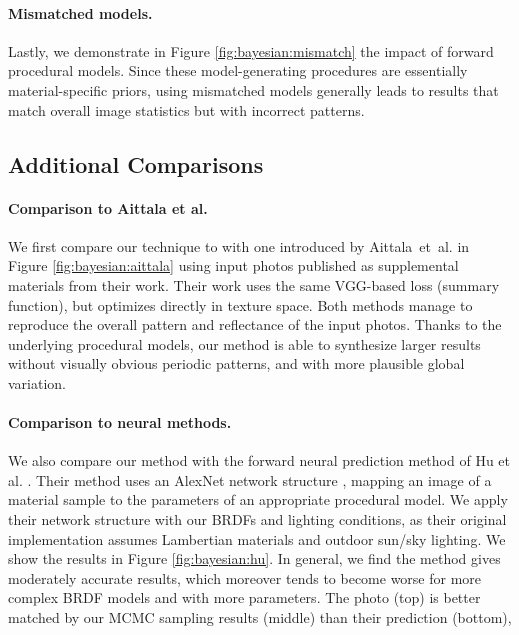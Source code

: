 

\paragraph{Mismatched models.}
Lastly, we demonstrate in Figure \ref{fig:bayesian:mismatch} the impact of forward procedural models.
Since these model-generating procedures are essentially material-specific priors, using mismatched models generally leads to results that match overall image statistics but with incorrect patterns.

\subsection{Additional Comparisons}



\paragraph{Comparison to Aittala et al.}
We first compare our technique to with one introduced by Aittala~et~al. \cite{aittala2016reflectance} in Figure \ref{fig:bayesian:aittala} using input photos published as supplemental materials from their work.
Their work uses the same VGG-based loss (summary function), but optimizes directly in texture space. Both methods manage to reproduce the overall pattern and reflectance of the input photos.
Thanks to the underlying procedural models, our method is able to synthesize larger results without visually obvious periodic patterns, and with more plausible global variation.



\paragraph{Comparison to neural methods.}
We also compare our method with the forward neural prediction method of Hu et al. \cite{hu2019novel}. Their method uses an AlexNet network structure \cite{krizhevsky2012imagenet}, mapping an image of a material sample to the parameters of an appropriate procedural model. We apply their network structure with our BRDFs and lighting conditions, as their original implementation assumes Lambertian materials and outdoor sun/sky lighting. We show the results in Figure \ref{fig:bayesian:hu}. In general, we find the method gives moderately accurate results, which moreover tends to become worse for more complex BRDF models and with more parameters. The photo (top) is better matched by our MCMC sampling results (middle) than their prediction (bottom),

